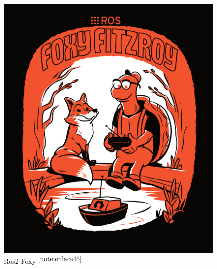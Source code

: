 \begin{figure}[ht!]
	\centering
	\begin{minipage}{0.4\linewidth}
		\centering
		\includegraphics[width=\linewidth]{figs/foxy.png}
		\caption*{\centering Ros2 Foxy $^{\ref{note:enlace46}}$} %
	\end{minipage}
	\hspace{2cm}
	\begin{minipage}{0.35\linewidth}
		\centering

\end{minipage}
\end{figure}
